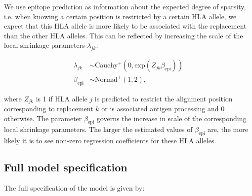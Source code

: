 \documentclass[fleqn,11pt]{SelfArx} %
\begin{document}
We use epitope prediction as information about the expected degree of sparsity, i.e. when knowing a certain position is restricted by a certain HLA allele, we expect that this HLA allele is more likely to be associated with the replacement than the other HLA alleles.
This can be reflected by increasing the scale of the local shrinkage parameters \(\lambda_{jk}\):

\begin{equation}
  \begin{aligned}
    \lambda_{jk} &\sim \text{Cauchy}^{+}(0, \text{exp}(Z_{jk}\beta_{\text{epi}})) \\
    \beta_{\text{epi}} &\sim \text{Normal}^{+}(1, 2),
  \end{aligned}
\end{equation}
 
where \(Z_{jk}\) is 1 if HLA allele \(j\) is predicted to restrict the alignment position corresponding to replacement \(k\) or is associated antigen processing and 0 otherwise.
The parameter \(\beta_{\text{epi}}\) governs the increase in scale of the  corresponding local shrinkage parameters. The larger the estimated values of \(\beta_{\text{epi}}\) are, the more likely it is to see non-zero regression coefficients for these HLA alleles.

\subsection*{Full model specification}

The full specification of the model is given by:
\end{document}
